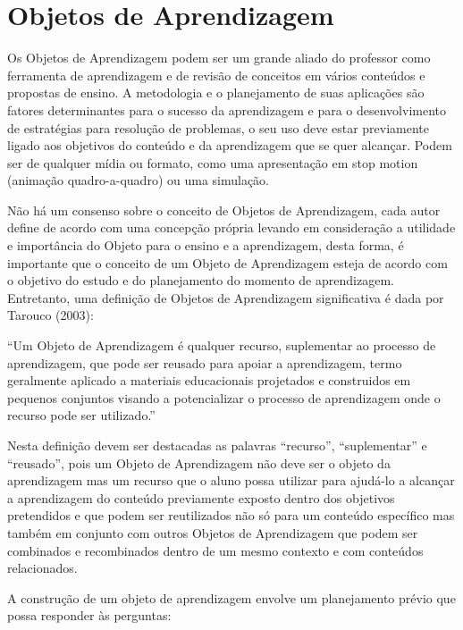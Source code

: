 \documentclass[12pt, openright, a4paper, brazil, english, french, spanish, bibjustif, openany, oneside]{abntex2}
\begin{document}
\chapter{Objetos de Aprendizagem}

Os Objetos de Aprendizagem podem ser um grande aliado do professor como ferramenta de aprendizagem e de revisão de conceitos em vários conteúdos e propostas de ensino. A metodologia e o planejamento de suas aplicações são fatores determinantes para o sucesso da aprendizagem e para o desenvolvimento de estratégias para resolução de problemas, o seu uso deve estar previamente ligado aos objetivos do conteúdo e da aprendizagem que se quer alcançar. Podem ser de qualquer mídia ou formato, como uma apresentação em stop motion (animação quadro-a-quadro) ou uma simulação.

Não há um consenso sobre o conceito de Objetos de Aprendizagem, cada autor define de acordo com uma concepção própria levando em consideração a utilidade e importância do Objeto para o ensino e a aprendizagem, desta forma, é importante que o conceito de um Objeto de Aprendizagem esteja de acordo com o objetivo do estudo e do planejamento do momento de aprendizagem. Entretanto, uma definição de Objetos de Aprendizagem significativa é dada por Tarouco (2003):


\begin{citacao}

``Um Objeto de Aprendizagem é qualquer recurso, suplementar ao processo de aprendizagem, que pode ser reusado para apoiar a aprendizagem, termo geralmente aplicado a materiais educacionais projetados e construidos em pequenos conjuntos visando a potencializar o processo de aprendizagem onde o recurso pode ser utilizado.''\cite{tarouco}

\end{citacao}

Nesta definição devem ser destacadas as palavras ``recurso'', ``suplementar'' e ``reusado'', pois um Objeto de Aprendizagem não deve ser o objeto da aprendizagem mas um recurso que o aluno possa utilizar para ajudá-lo a alcançar a aprendizagem do conteúdo previamente exposto dentro dos objetivos pretendidos e que podem ser reutilizados não só para um conteúdo específico mas também em conjunto com outros Objetos de Aprendizagem que podem ser combinados e recombinados dentro de um mesmo contexto e com conteúdos relacionados.

A construção de um objeto de aprendizagem envolve um planejamento prévio que possa responder às perguntas:
\end{document}
